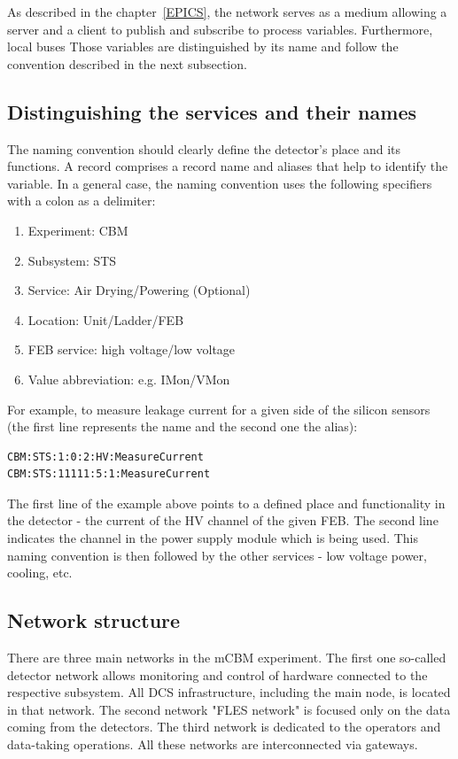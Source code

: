 As described in the chapter~\ref{EPICS}, the network serves as a medium allowing a server and a client to publish and subscribe to process variables. Furthermore, local buses  Those variables are distinguished by its name and follow the convention described in the next subsection.
\subsection{Distinguishing the services and their names}
The naming convention should clearly define the detector's place and its functions.  A record comprises a record name and aliases that help to identify the variable. In a general case, the naming convention uses the following specifiers with a colon as a delimiter:
\begin{enumerate} 
\item Experiment: CBM
\item Subsystem: \gls{STS}
\item Service: Air Drying/Powering (Optional)
\item Location: Unit/Ladder/FEB
\item \gls{FEB} service: high voltage/low voltage
\item Value abbreviation: e.g. IMon/VMon
\end{enumerate}

For example, to measure leakage current for a given side of the silicon sensors  (the first line represents the name and the second one the alias):
\begin{verbatim}
CBM:STS:1:0:2:HV:MeasureCurrent
CBM:STS:11111:5:1:MeasureCurrent
\end{verbatim}
The first line of the example above points to a defined place and functionality in the detector - the current of the \gls{HV} channel of the given \gls{FEB}. The second line indicates the channel in the power supply module which is being used. This naming convention is then followed by the other services - low voltage power, cooling, etc.  
\subsection{Network structure}
There are three main networks in the mCBM experiment. The first one so-called detector network allows monitoring and control of hardware connected to the respective subsystem. All \gls{DCS} infrastructure, including the main node, is located in that network. The second network "FLES network" is focused only on the data coming from the detectors. The third network is dedicated to the operators and data-taking operations. All these networks are interconnected via gateways.  

